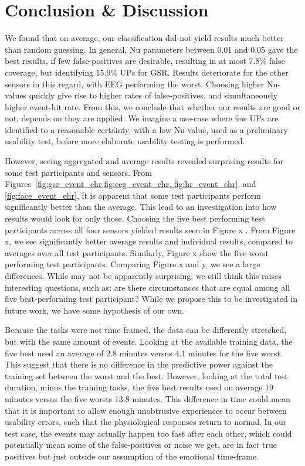 \section{Conclusion \& Discussion}
We found that on average, our classification did not yield results much better than random guessing. In general, Nu
parameters between 0.01 and 0.05 gave the best results, if few false-positives are desirable, resulting in at most
$7.8\%$ false coverage, but identifying $15.9\%$ UPs for GSR. Results deteriorate for the other sensors in this regard,
with EEG performing the worst. Choosing higher Nu-values quickly give rise to higher rates of false-positives, and
simultaneously higher event-hit rate. From this, we conclude that whether our results are good or not, depends on they
are applied. We imagine a use-case where few UPs are identified to a reasonable certainty, with a low Nu-value, used as
a preliminary usability test, before more elaborate usability testing is performed.

However, seeing aggregated and average results revealed surprising results for some test participants and sensors. From
Figures~\ref{fig:gsr_event_ehr,fig:eeg_event_ehr, fig:hr_event_ehr}, and \ref{fig:face_event_ehr}, it is apparent that
some test participants perform significantly better than the average. This lead to an investigation into how results
would look for only those. Choosing the five best performing test participants across all four sensors yielded results
seen in Figure x . From Figure x, we see significantly better average results and individual results,
compared to averages over all test participants. Similarly, Figure x show the five worst performing test
participants. Comparing Figure x and y, we see a large differences. While may not be apparently surprising, we still
think this raises interesting questions, such as: are there circumstances that are equal among all five best-performing
test participant? While we propose this to be investigated in future work, we have some hypothesis of our own.

Because the tasks were not time framed, the data can be differently stretched, but with the same amount of
events. Looking at the available training data, the five best used an average of 2.8 minutes versus 4.1 minutes for the
five worst. This suggest that there is no difference in the predictive power against the training set between the worst
and the best. However, looking at the total test duration, minus the training tasks, the five best results used on
average 19 minutes versus the five worsts 13.8 minutes. This difference in time could mean that it is important to allow
enough unobtrusive experiences to occur between usability errors, such that the physiological responses return to
normal. In our test case, the events may actually happen too fast after each other, which could potentially mean some of
the false-positives or noise we get, are in fact true positives but just outside our assumption of the emotional
time-frame.

